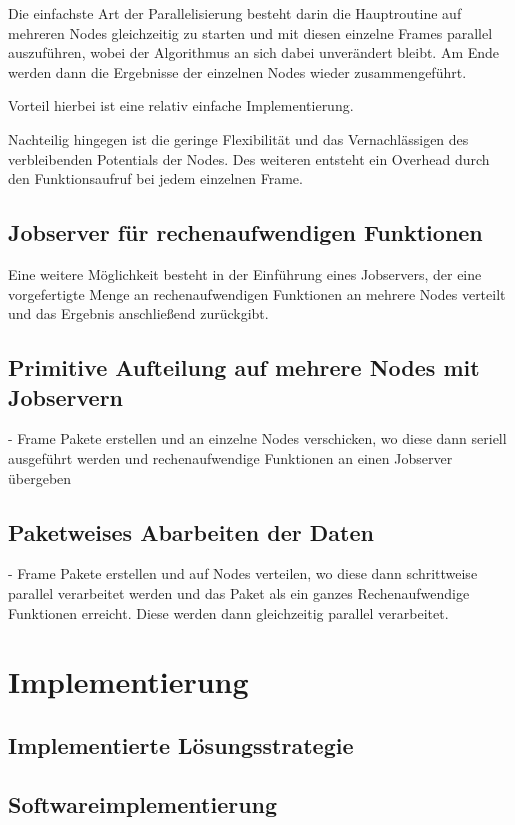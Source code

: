 Die einfachste Art der Parallelisierung besteht darin die Hauptroutine auf mehreren Nodes gleichzeitig zu starten und mit diesen einzelne Frames parallel auszuführen, wobei der Algorithmus an sich dabei unverändert bleibt. 
Am Ende werden dann die Ergebnisse der einzelnen Nodes wieder zusammengeführt.

Vorteil hierbei ist eine relativ einfache Implementierung. 

Nachteilig hingegen ist die geringe Flexibilität und das Vernachlässigen des verbleibenden Potentials der Nodes. Des weiteren entsteht ein Overhead durch den Funktionsaufruf bei jedem einzelnen Frame. 


\subsection{Jobserver für rechenaufwendigen Funktionen}
\label{subsec:jobserver}

Eine weitere Möglichkeit besteht in der Einführung eines Jobservers, der eine vorgefertigte Menge an rechenaufwendigen Funktionen an mehrere Nodes verteilt und das Ergebnis anschließend zurückgibt. 


\subsection{Primitive Aufteilung auf mehrere Nodes mit Jobservern}
 - Frame Pakete erstellen und an einzelne Nodes verschicken, wo diese dann seriell ausgeführt werden und rechenaufwendige Funktionen an einen Jobserver übergeben


\subsection{Paketweises Abarbeiten der Daten}
 - Frame Pakete erstellen und auf Nodes verteilen, wo diese dann schrittweise parallel verarbeitet werden und das Paket als ein ganzes Rechenaufwendige Funktionen erreicht. Diese werden dann gleichzeitig parallel verarbeitet. 


\section{Implementierung}

\subsection{Implementierte Lösungsstrategie}

\subsection{Softwareimplementierung}
\fi